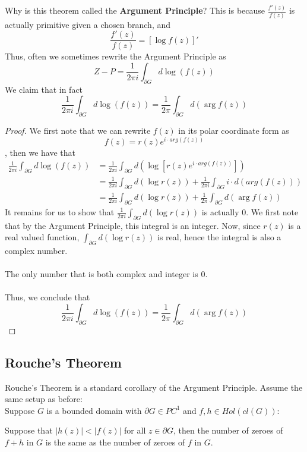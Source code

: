 \documentclass{article}
\begin{document}
\begin{remark}
Why is this theorem called the \textbf{Argument Principle}? This is because $\frac{f'(z)}{f(z)}$ is actually primitive given a chosen branch, and
\[\frac{f'(z)}{f(z)} = [\log f(z)]'\]
Thus, often we sometimes rewrite the Argument Principle as
\[Z - P = \frac{1}{2\pi i} \int_{\partial G} d \log(f(z))\]
We claim that in fact
\[\frac{1}{2\pi i} \int_{\partial G} d \log(f(z)) = \frac{1}{2\pi} \int_{\partial G} d(\arg f(z))\]
\end{remark}

\begin{proof}
We first note that we can rewrite $f(z)$ in its polar coordinate form as
\[f(z) = r(z) e^{i \cdot arg(f(z))}\]
, then we have that
\begin{align*}
    \frac{1}{2\pi i} \int_{\partial G} d \log(f(z)) &= \frac{1}{2\pi i} \int_{\partial G} d(\log[r(z)e^{i \cdot arg(f(z))}])\\
    &= \frac{1}{2\pi i} \int_{\partial G} d(\log r(z)) + \frac{1}{2\pi i} \int_{\partial G} i \cdot d(arg(f(z)))\\
    &= \frac{1}{2\pi i} \int_{\partial G} d(\log r(z)) + \frac{1}{2\pi} \int_{\partial G} d(\arg f(z))
\end{align*}
It remains for us to show that $\frac{1}{2\pi i} \int_{\partial G} d(\log r(z))$ is actually $0$. We first note that by the Argument Principle, this integral is an integer. Now, since $r(z)$ is a real valued function, $\int_{\partial G} d(\log r(z))$ is real, hence the integral is also a complex number.\\\\
The only number that is both complex and integer is $0$.\\\\
Thus, we conclude that
\[\frac{1}{2\pi i} \int_{\partial G} d \log(f(z)) = \frac{1}{2\pi} \int_{\partial G} d(\arg f(z))\]
\end{proof}

\subsection{Rouche's Theorem}

Rouche's Theorem is a standard corollary of the Argument Principle. Assume the same setup as before:\\

Suppose $G$ is a bounded domain with $\partial G \in PC^1$ and $f, h \in Hol(cl(G))$:

\begin{theorem}
Suppose that $|h(z)| < |f(z)|$ for all $z \in \partial G$, then the number of zeroes of $f + h$ in $G$ is the same as the number of zeroes of $f$ in $G$.
\end{theorem}
\end{document}
